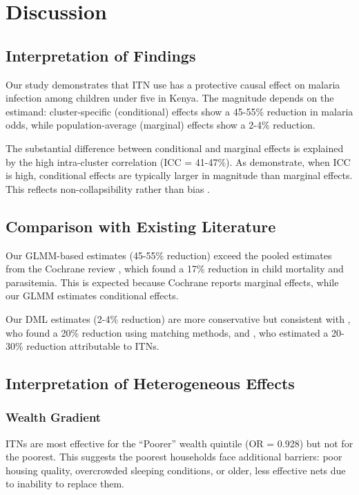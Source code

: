 \chapter{Discussion}

\section{Interpretation of Findings}

Our study demonstrates that ITN use has a protective causal effect on malaria infection among children under five in Kenya. The magnitude depends on the estimand: cluster-specific (conditional) effects show a 45-55\% reduction in malaria odds, while population-average (marginal) effects show a 2-4\% reduction.

The substantial difference between conditional and marginal effects is explained by the high intra-cluster correlation (ICC = 41-47\%). As \citet{neuhaus1991comparison} demonstrate, when ICC is high, conditional effects are typically larger in magnitude than marginal effects. This reflects non-collapsibility rather than bias \citep{greenland1999confounding}.

\section{Comparison with Existing Literature}

Our GLMM-based estimates (45-55\% reduction) exceed the pooled estimates from the Cochrane review \citep{pryce2018insecticide}, which found a 17\% reduction in child mortality and parasitemia. This is expected because Cochrane reports marginal effects, while our GLMM estimates conditional effects.

Our DML estimates (2-4\% reduction) are more conservative but consistent with \citet{lim2011net}, who found a 20\% reduction using matching methods, and \citet{bhatt2015effect}, who estimated a 20-30\% reduction attributable to ITNs.

\section{Interpretation of Heterogeneous Effects}

\subsection{Wealth Gradient}

ITNs are most effective for the ``Poorer'' wealth quintile (OR = 0.928) but not for the poorest. This suggests the poorest households face additional barriers: poor housing quality, overcrowded sleeping conditions, or older, less effective nets due to inability to replace them.

